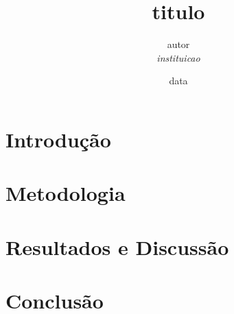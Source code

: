 \documentclass[12pt, a4paper, twocolumn]{article}
{general}
\title{{titulo}}
\author{{autor} \\ \textit{{instituicao}}}
\date{{data}}
\begin{document}
\maketitle

\begin{abstract}

\end{abstract}

\tableofcontents
\newpage

\section{Introdução}


\section{Metodologia}


\section{Resultados e Discussão}


\section{Conclusão}




\end{document}
